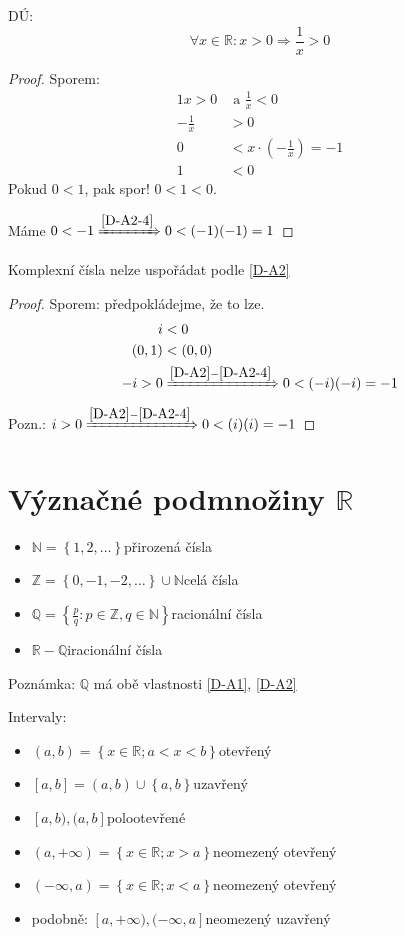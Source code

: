 DÚ:
\begin{equation}
	\forall x \in \mathbb{R}: x>0 \Rightarrow \frac{1}{x}>0
\end{equation}
\begin{proof}
	Sporem:
	\begin{alignat*}{1}
		x>0 &\text{ a } \frac{1}{x}<0 \\
		-\frac{1}{x}&>0 \\
		0&<x\cdot\left(-\frac{1}{x}\right) = -1 \\
		1 &< 0
	\end{alignat*}
	Pokud $0<1$, pak spor! $0<1<0$.

	Máme $0<-1 \xRightarrow{\autoref{D-A2-4}} 0<(-1)(-1) = 1$
\end{proof}

\begin{example}
	Komplexní čísla nelze uspořádat podle \autoref{D-A2}
\end{example}
\begin{proof}
	Sporem: předpokládejme, že to lze.
	\begin{alignat*}{1}
		i&<0 \\
		(0,1)&<(0,0) \\
		-i>0 &\xRightarrow{\autoref*{D-A2}-\autoref{D-A2-4}} 0<(-i)(-i) = -1
	\end{alignat*}
	Pozn.: $i>0 \xRightarrow{\autoref*{D-A2}-\autoref{D-A2-4}} 0<(i)(i) = -1$
\end{proof}

\section{Význačné podmnožiny \texorpdfstring{$\mathbb{R}$}{R}}
\begin{itemize}
	\item $\mathbb{N} = \left\{1,2,\dots\right\}$\quad přirozená čísla
	\item $\mathbb{Z} = \left\{0,-1,-2,\dots\right\}\cup\mathbb{N}$\quad celá čísla
	\item $\mathbb{Q} = \left\{\frac{p}{q}: p\in\mathbb{Z}, q\in\mathbb{N}\right\}$\quad racionální čísla
	\item $\mathbb{R} - \mathbb{Q}$\quad iracionální čísla
\end{itemize}

Poznámka: $\mathbb{Q}$ má obě vlastnosti \autoref{D-A1}, \autoref{D-A2}

Intervaly:
\begin{itemize}
	\item $(a,b) = \left\{x\in\mathbb{R}; a<x<b\right\}$\quad otevřený
	\item $[a,b] = (a,b)\cup\left\{a,b\right\}$\quad uzavřený
	\item $[a,b), (a,b]$\quad polootevřené
	\item $(a,+\infty) = \left\{x\in\mathbb{R}; x>a\right\}$\quad neomezený otevřený
	\item $(-\infty, a) = \left\{x\in\mathbb{R}; x<a\right\}$\quad neomezený otevřený
	\item podobně: $[a, +\infty), (-\infty, a]$\quad neomezený uzavřený
\end{itemize}

